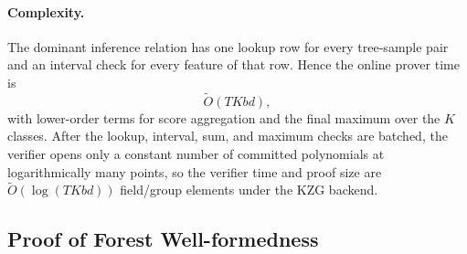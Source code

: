 \paragraph{Complexity.}
The dominant inference relation has one lookup row for every
tree-sample pair and an interval check for every feature of that row. Hence the
online prover time is
\[
    \tilde{O}(TKbd),
\]
with lower-order terms for score aggregation and the final maximum over the
$K$ classes. After the lookup, interval, sum, and maximum checks are batched,
the verifier opens only a constant number of committed polynomials at
logarithmically many points, so the verifier time and proof size are
$\tilde{O}(\log(TKbd))$ field/group elements under the KZG backend.

\subsection{Proof of Forest Well-formedness}\label{subsec:proof of well-formedness}

